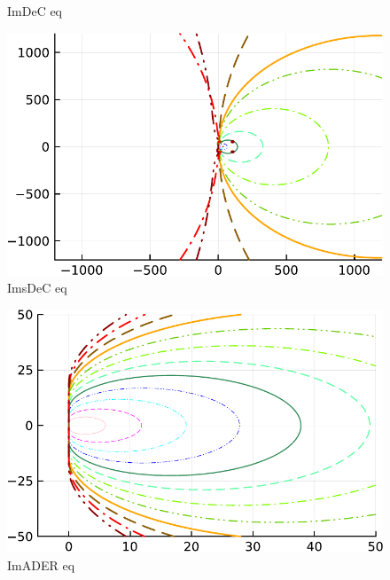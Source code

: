 \begin{figure}
\begin{minipage}[t]{0.32\textwidth}
		ImDeC eq
	\end{minipage}
	\begin{minipage}[t]{0.32\textwidth}
		\centering
	\includegraphics[width=\textwidth, trim={0 0 0 0}, clip]{pdf/odepics/IMsDeC_eq_ord13-crop.pdf}\\
	ImsDeC eq
	\end{minipage}
	\begin{minipage}[t]{0.32\textwidth}
		\centering
		\includegraphics[width=\textwidth, trim={0 0 0 0}, clip]{pdf/odepics/IMADER_eq_ord13-crop.pdf}\\
		ImADER eq
	\end{minipage}\\
	\begin{minipage}[t]{0.32\textwidth}
		\centering

\end{minipage}
\end{figure}

